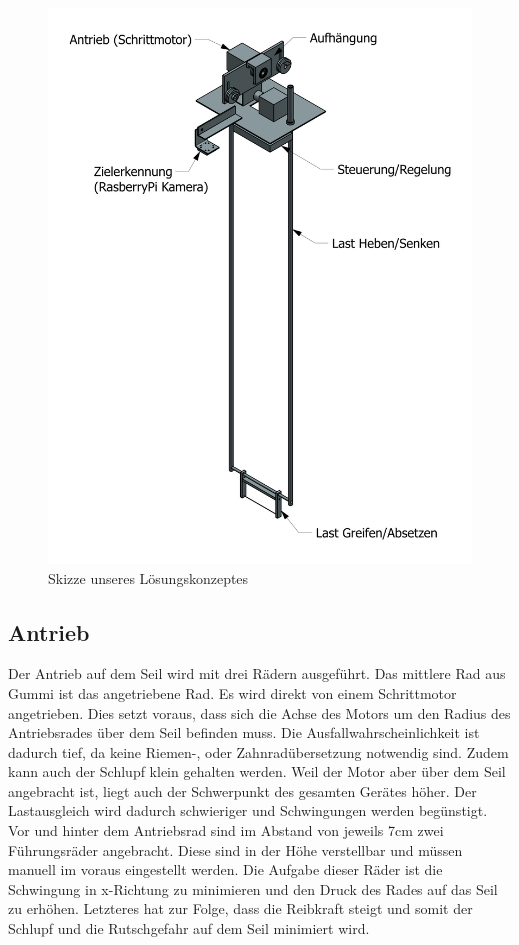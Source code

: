 \documentclass[a4paper]{report}
\begin{document}
\begin{figure}[h!]
	\centering
	\includegraphics[height=0.5\textheight,keepaspectratio]{marku_103000_bg-00_ze1}
	\caption{Skizze unseres Lösungskonzeptes}
	\label{fig:LoesungsKonzept}
\end{figure}

\newpage

\subsection{Antrieb}
Der Antrieb auf dem Seil wird mit drei Rädern ausgeführt. Das mittlere Rad aus Gummi ist das angetriebene Rad. Es wird direkt von einem Schrittmotor angetrieben. Dies setzt voraus, dass sich die Achse des Motors um den Radius des Antriebsrades über dem Seil befinden muss. Die Ausfallwahrscheinlichkeit ist dadurch tief, da keine Riemen-, oder Zahnradübersetzung notwendig sind. Zudem kann auch der Schlupf klein gehalten werden. Weil der Motor aber über dem Seil angebracht ist, liegt auch der Schwerpunkt des gesamten Gerätes höher. Der Lastausgleich wird dadurch schwieriger und Schwingungen werden begünstigt.
\\
Vor und hinter dem Antriebsrad sind im Abstand von jeweils 7cm zwei Führungsräder angebracht. Diese sind in der Höhe verstellbar und müssen manuell im voraus eingestellt werden. Die Aufgabe dieser Räder ist die Schwingung in x-Richtung zu minimieren und den Druck des Rades auf das Seil zu erhöhen. Letzteres hat zur Folge, dass die Reibkraft steigt und somit der Schlupf und die Rutschgefahr auf dem Seil minimiert wird.
\end{document}

